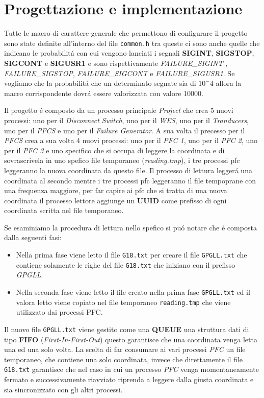 \documentclass[11pt, oneside]{article}   	%
\begin{document}
\section{Progettazione e implementazione}
Tutte le macro di carattere generale che permettono di configurare il progetto sono state definite all'interno del file \texttt{common.h} tra queste ci sono anche quelle che indicano le probabilit\'a con cui vengono lanciati i segnali \textbf{SIGINT}, \textbf{SIGSTOP}, \textbf{SIGCONT} e \textbf{SIGUSR1} e sono rispettivamente \textit{FAILURE\_SIGINT }, \textit{FAILURE\_SIGSTOP}, \textit{FAILURE\_SIGCONT} e \textit{FAILURE\_SIGUSR1}. Se vogliamo  che la probabilit\'a che un determinato segnate sia di $10^-4$ allora la macro corrispondente dovr\'a essere valorizzata con valore 10000.\par  

Il progetto \'e composto da un processo principale \textit{Project} che crea 5 nuovi processi: uno per il \textit{Disconnect Switch}, uno per il \textit{WES}, uno per il \textit{Tranducers}, uno per il \textit{PFCS} e uno per il \textit{Failure Generator}. A sua volta il precesso per il \textit{PFCS} crea a sua volta 4 nuovi processi: uno per il \textit{PFC 1}, uno per il \textit{PFC 2}, uno per il \textit{PFC 3} e uno specifico che si occupa di leggere la coordinata e di sovrascrivela in uno spefico file temporaneo (\textit{reading.tmp}), i tre processi pfc leggeranno la nuova coordinata da questo file. Il processo di lettura legger\'a una coordinata al secondo mentre i tre processi pfc leggeranno il file tempoprane con una frequenza maggiore, per far capire ai pfc che si tratta di una nuova coordinata il processo lettore aggiunge un \textbf{UUID} come prefisso di ogni coordinata scritta nel file temporaneo.\par

Se esaminiamo la procedura di lettura nello spefico si pu\'o notare che \'e composta dalla seguenti fasi:
\begin{itemize}
	\item Nella prima fase viene letto il file \texttt{G18.txt} per creare il file \texttt{GPGLL.txt} che contiene solamente le righe del file \texttt{G18.txt} che iniziano con il prefisso \textit{GPGLL}.
	\item Nella seconda fase viene letto il file creato nella prima fase \texttt{GPGLL.txt} ed il valora letto viene copiato nel file temporaneo \texttt{reading.tmp} che viene utilizzato dai processi PFC.
\end{itemize}
Il nuovo file \texttt{GPGLL.txt} viene gestito come una \textbf{QUEUE} una struttura dati di tipo \textbf{FIFO} (\textit{First-In-First-Out}) questo garantisce che una coordinata venga letta una ed una solo volta. La scelta di far consumare ai vari processi \textit{PFC} un file temporaneo, che contiene una solo coordinata, invece che direttamente il file \texttt{G18.txt} garantisce che nel caso in cui un processo \textit{PFC} venga momentaneamente fermato e successivamente riavviato riprenda a leggere dalla giusta coordinata e sia sincronizzato con gli altri processi.\par
\end{document}
